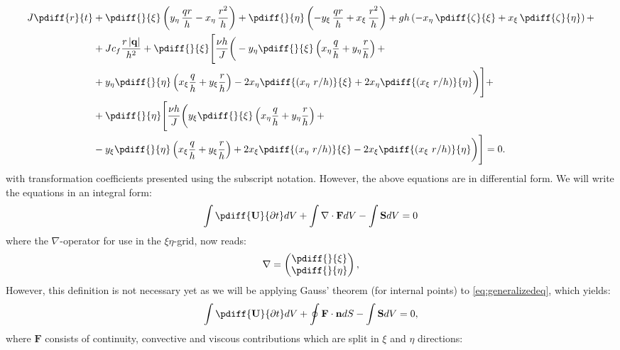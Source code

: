 	\begin{align}\label{CurviYmom_Expanded}
		\begin{aligned}
			J \pdiff{r}{t}
			&+ \pdiff{}{\xi} \left( y_{\eta}\, \frac{q r}{h} - x_{\eta}\, \frac{r^2}{h} \right)
			+ \pdiff{}{\eta} \left( -y_{\xi}\, \frac{q r}{h} + x_{\xi}\, \frac{r^2}{h} \right)
			+ g h \left( -x_{\eta}\, \pdiff{\zeta}{\xi} + x_{\xi}\, \pdiff{\zeta}{\eta} \right) +
            \\
			&+ J c_f \frac{r\, |\mathbf{q}|}{h^2}
			+  \pdiff{}{\xi} \Bigg[\frac{\nu h}{J} \bigg(
			-y_{\eta} \pdiff{}{\xi} \left(
			x_{\eta} \frac{q}{h} + y_{\eta} \frac{r}{h} \right) + \\
			&+ y_{\eta} \pdiff{}{\eta} \left(
			x_{\xi} \frac{q}{h} + y_{\xi} \frac{r}{h}  \right)
			- 2 x_{\eta} \pdiff{(x_{\eta}\ r/h)}{\xi}
			+ 2 x_{\eta}  \pdiff{(x_{\xi}\ r/h)}{\eta} \bigg) \Bigg] +
            \\
			&+  \pdiff{}{\eta} \Bigg[\frac{\nu h}{J} \bigg(
			y_{\xi} \pdiff{}{\xi} \left(x_{\eta} \frac{q}{h}
			+ y_{\eta} \frac{r}{h} \right) + \\
			&- y_{\xi} \pdiff{}{\eta} \left( x_{\xi} \frac{q}{h} +  y_{\xi} \frac{r}{h} \right)
			+ 2 x_{\xi} \pdiff{(x_{\eta}\ r/h)}{\xi}
			- 2 x_{\xi} \pdiff{(x_{\xi}\ r/h)}{\eta} \bigg) \Bigg] = 0.
		\end{aligned}
	\end{align}
%
with transformation coefficients presented using the subscript notation.
However, the above equations are in differential form.
We will write the equations in an integral form:
%
\begin{align}\label{eq:generalizedeq}
	\int \pdiff{\mathbf{U}}{\partial t}dV + \int \nabla \cdot \mathbf{F} dV - \int \mathbf{S}dV = 0
\end{align}
%
where the $\nabla$-operator for use in the $\xi\eta$-grid, now reads:
%
\begin{align}
	\nabla=
	\begin{pmatrix}
		\pdiff{}{\xi}\\
		\pdiff{}{\eta}
	\end{pmatrix},
\end{align}
%
However, this definition is not necessary yet as we will be applying Gauss' theorem (for internal points) to \autoref{eq:generalizedeq}, which yields:
%
\begin{align}
	\int \pdiff{\mathbf{U}}{\partial t}dV + \oint \mathbf{F}\cdot \mathbf{n}dS - \int \mathbf{S}dV = 0,
\end{align}
%
where $\mathbf{F}$ consists of continuity, convective and viscous contributions which are split in $\xi$ and $\eta$ directions:
